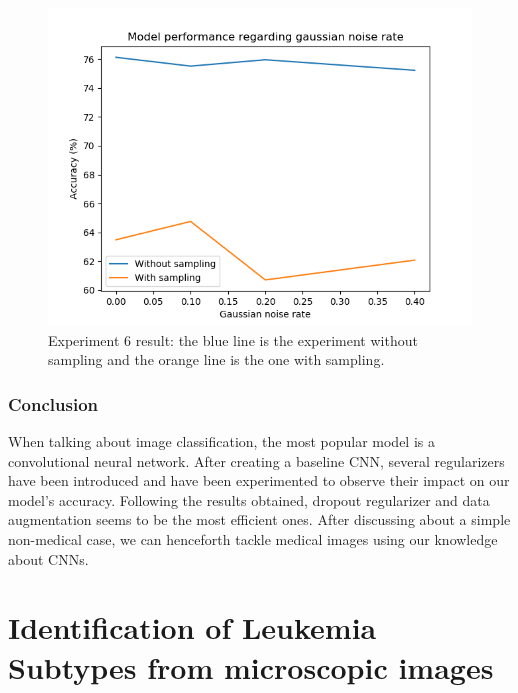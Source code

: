 \documentclass[11pt, openany]{report}
\theoremstyle{plain}
\theoremstyle{definition}
\theoremstyle{remark}
\begin{document}
\begin{figure}[H]
  \centering
  \includegraphics[scale=0.6]{Code/figures_result/gaussian_noise_graph.png}
  \caption{Experiment 6 result: the blue line is the experiment without sampling and the orange line is the one with sampling.}
  \label{fig:cifar_noise_res}
\end{figure}


\subsection{Conclusion}
When talking about image classification, the most popular model is a convolutional neural network. After creating a baseline CNN, several regularizers have been introduced and have been experimented to observe their impact on our model's accuracy. Following the results obtained, dropout regularizer and data augmentation seems to be the most efficient ones. After discussing about a simple non-medical case, we can henceforth tackle medical images using our knowledge about CNNs. 


\chapter{Identification of Leukemia Subtypes from microscopic images}








\nocite{*}

\end{document}
